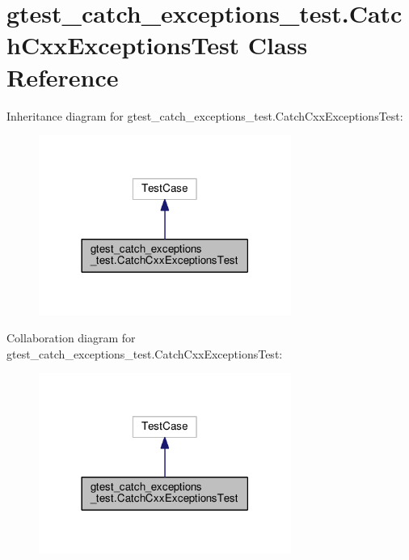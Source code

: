 \hypertarget{classgtest__catch__exceptions__test_1_1CatchCxxExceptionsTest}{}\section{gtest\+\_\+catch\+\_\+exceptions\+\_\+test.\+Catch\+Cxx\+Exceptions\+Test Class Reference}
\label{classgtest__catch__exceptions__test_1_1CatchCxxExceptionsTest}


Inheritance diagram for gtest\+\_\+catch\+\_\+exceptions\+\_\+test.\+Catch\+Cxx\+Exceptions\+Test\+:
\nopagebreak
\begin{figure}[H]
\begin{center}
\leavevmode
\includegraphics[width=234pt]{classgtest__catch__exceptions__test_1_1CatchCxxExceptionsTest__inherit__graph}
\end{center}
\end{figure}


Collaboration diagram for gtest\+\_\+catch\+\_\+exceptions\+\_\+test.\+Catch\+Cxx\+Exceptions\+Test\+:
\nopagebreak
\begin{figure}[H]
\begin{center}
\leavevmode
\includegraphics[width=234pt]{classgtest__catch__exceptions__test_1_1CatchCxxExceptionsTest__coll__graph}
\end{center}
\end{figure}

